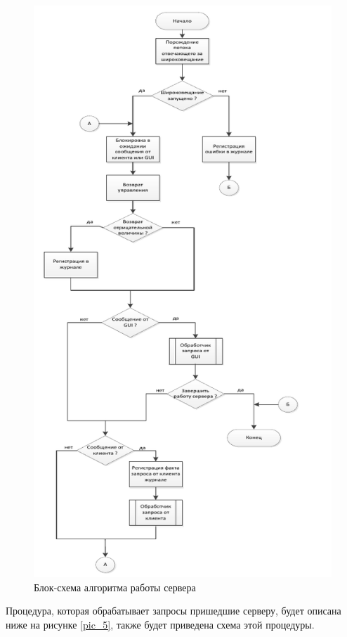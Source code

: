 \begin{figure}[!p]
    \centering
    \includegraphics[scale=0.88]{pic_4}
    \caption{Блок-схема алгоритма работы сервера}\label{pic_4}
\end{figure}

\newpar
Процедура, которая обрабатывает запросы пришедшие серверу, будет описана
ниже на рисунке \ref{pic_5}, также будет приведена схема этой процедуры.

